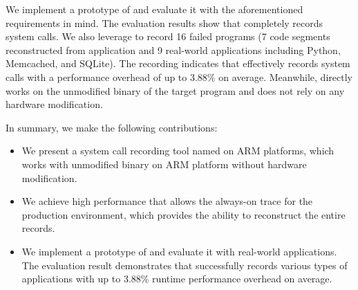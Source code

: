 We implement a prototype of \TheName{} and evaluate it with the 
aforementioned requirements in mind. The evaluation results show that
\TheName{} completely records system calls. 
We also leverage \TheName to record 16 failed programs (7 code segments 
reconstructed from application and 9 real-world applications including Python, Memcached, and SQLite). The recording indicates that \TheName effectively records system calls
 with a performance overhead of
up to 3.88\% on average. Meanwhile, \TheName{} directly works on the unmodified binary of the target 
program and does not rely on any hardware modification.



In summary, we make the following contributions:
\begin{itemize}
    \item We present a system call recording tool named \TheName{} on ARM platforms, which 
     works with
    unmodified binary on ARM platform without hardware modification.
    \item We achieve high performance that allows the
    always-on trace for the production environment, which provides \TheName{} the ability
    to reconstruct the entire records.
    \item We implement a prototype of \TheName{} and evaluate it with
    real-world applications.
    The evaluation result demonstrates that \TheName{} successfully records
    various types of applications with up to 3.88\% runtime
    performance overhead on average.
  \end{itemize}
  